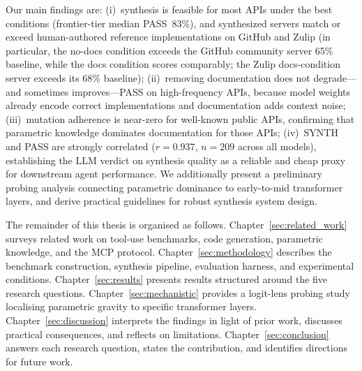 Our main findings are: (i)~synthesis is feasible for most APIs under the best conditions (frontier-tier median PASS~83\%), and synthesized servers match or exceed human-authored reference implementations on GitHub and Zulip (in particular, the no-docs condition exceeds the GitHub community server 65\% baseline, while the docs condition scores comparably; the Zulip docs-condition server exceeds its 68\% baseline); (ii)~removing documentation does not degrade---and sometimes improves---PASS on high-frequency APIs, because model weights already encode correct implementations and documentation adds context noise; (iii)~mutation adherence is near-zero for well-known public APIs, confirming that parametric knowledge dominates documentation for those APIs; (iv)~SYNTH and PASS are strongly correlated ($r = 0.937$, $n = 209$ across all models), establishing the LLM verdict on synthesis quality as a reliable and cheap proxy for downstream agent performance. We additionally present a preliminary probing analysis connecting parametric dominance to early-to-mid transformer layers, and derive practical guidelines for robust synthesis system design.

The remainder of this thesis is organised as follows.
Chapter~\ref{sec:related_work} surveys related work on tool-use benchmarks, code generation, parametric knowledge, and the MCP protocol.
Chapter~\ref{sec:methodology} describes the benchmark construction, synthesis pipeline, evaluation harness, and experimental conditions.
Chapter~\ref{sec:results} presents results structured around the five research questions.
Chapter~\ref{sec:mechanistic} provides a logit-lens probing study localising parametric gravity to specific transformer layers.
Chapter~\ref{sec:discussion} interprets the findings in light of prior work, discusses practical consequences, and reflects on limitations.
Chapter~\ref{sec:conclusion} answers each research question, states the contribution, and identifies directions for future work.

